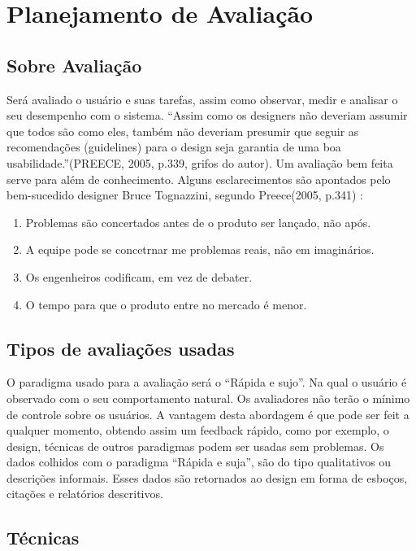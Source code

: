 \chapter[Planejamento de Avaliação]{Planejamento de Avaliação}

\section{Sobre Avaliação}

	Será avaliado o usuário e suas tarefas, assim como observar, medir e analisar o seu desempenho com o sistema. 
	“Assim como os designers não deveriam assumir que todos são como eles, também não deveriam presumir que seguir as recomendações (guidelines) para o design seja garantia de uma boa usabilidade.”(PREECE, 2005, p.339, grifos do autor).
	Um avaliação bem feita serve para além de conhecimento. Alguns esclarecimentos são apontados pelo bem-sucedido designer Bruce Tognazzini, segundo Preece(2005, p.341) \nocite{jeniffer05}:

\begin{enumerate}
	\item Problemas são concertados antes de o produto ser lançado, não após.
	\item A equipe pode se concetrnar me problemas reais, não em imaginários.
	\item Os engenheiros codificam, em vez de debater.
	\item O tempo para que o produto entre no mercado é menor.
\end{enumerate}

\section{Tipos de avaliações usadas}

	O paradigma usado para a avaliação será o “Rápida e sujo”. Na qual o usuário é observado com o seu comportamento natural. Os avaliadores não terão o mínimo de controle sobre os usuários. A vantagem desta abordagem é que pode ser feit a qualquer momento, obtendo assim um feedback rápido, como por exemplo, o design, técnicas de outros paradigmas podem ser usadas sem problemas. 
	Os dados colhidos com o paradigma “Rápida e suja”, são do tipo qualitativos ou descrições informais. Esses dados são retornados ao design em forma de esboços, citações e relatórios descritivos.

\section{Técnicas} 

